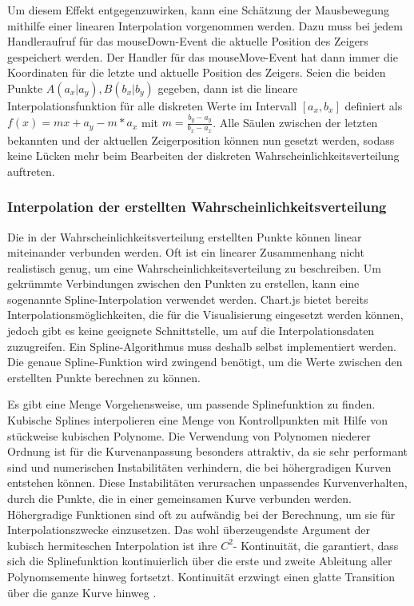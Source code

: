 Um diesem Effekt entgegenzuwirken, kann eine Schätzung der Mausbewegung mithilfe einer linearen Interpolation vorgenommen werden. Dazu muss bei jedem Handleraufruf für das mouseDown-Event die aktuelle Position des Zeigers gespeichert werden. Der Handler für das mouseMove-Event hat dann immer die Koordinaten für die letzte und aktuelle Position des Zeigers. Seien die beiden Punkte $A(a_x|a_y), B(b_x|b_y)$ gegeben, dann ist die lineare Interpolationsfunktion für alle diskreten Werte im Intervall $[a_x,b_x]$ definiert als $f(x)=mx+a_y-m*a_x$ mit $m=\frac{b_y-a_y}{b_x-a_x}$. Alle Säulen zwischen der letzten bekannten und der aktuellen Zeigerposition können nun gesetzt werden, sodass keine Lücken mehr beim Bearbeiten der diskreten Wahrscheinlichkeitsverteilung auftreten.

\subsubsection{Interpolation der erstellten Wahrscheinlichkeitsverteilung}

Die in der Wahrscheinlichkeitsverteilung erstellten Punkte können linear miteinander verbunden werden. Oft ist ein linearer Zusammenhang nicht realistisch genug, um eine Wahrscheinlichkeitsverteilung zu beschreiben. Um gekrümmte Verbindungen zwischen den Punkten zu erstellen, kann eine sogenannte Spline-Interpolation verwendet werden. Chart.js bietet bereits Interpolationsmöglichkeiten, die für die Visualisierung eingesetzt werden können, jedoch gibt es keine geeignete Schnittstelle, um auf die Interpolationsdaten zuzugreifen. Ein Spline-Algorithmus muss deshalb selbst implementiert werden. Die genaue Spline-Funktion wird zwingend benötigt, um die Werte zwischen den erstellten Punkte berechnen zu können. 

Es gibt eine Menge Vorgehensweise, um passende Splinefunktion zu finden. 
Kubische Splines interpolieren eine Menge von Kontrollpunkten mit Hilfe von
stückweise kubischen Polynome. Die Verwendung von Polynomen niederer Ordnung ist für die Kurvenanpassung besonders attraktiv, da sie sehr performant sind und numerischen Instabilitäten verhindern, die bei höhergradigen Kurven entstehen können. Diese Instabilitäten verursachen unpassendes Kurvenverhalten, durch die Punkte, die in einer gemeinsamen Kurve verbunden werden. Höhergradige Funktionen sind oft zu aufwändig bei der Berechnung, um sie für Interpolationszwecke einzusetzen. Das wohl überzeugendste
Argument der kubisch hermiteschen Interpolation ist ihre $C^2$-
Kontinuität, die garantiert, dass sich die Splinefunktion kontinuierlich über die erste und zweite Ableitung aller Polynomsemente hinweg fortsetzt.
Kontinuität erzwingt einen glatte Transition über die ganze Kurve hinweg \cite{Wolberg1999}.

